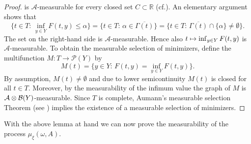 \documentclass[11pt]{article}
\newcommand{\cf}{cf.\xspace}
\numberwithin{equation}{section}
\def\mto{\mathchoice{\longmapsto}{\mapsto}{\mapsto}{\mapsto}}
\theoremstyle{definition}
\let\w\omega
\newcommand{\R}{\mathbb{R}}
\begin{document}
\begin{proof}
is $\mathcal{A}$-measurable for every closed set $C\subset \R$ (\cf \cite[Rem.\,6.4]{FoLe}). An elementary argument shows that\vspace*{-3pt}
\begin{equation*}
\{t\in T:\, \inf_{y\in Y}F(t,y)\leq\alpha\}=\{t\in T:\,\alpha\in \overline{\Gamma(t)}\}=\{t\in T:\, \overline{\Gamma(t)}\cap \{\alpha\}\neq\emptyset\}.
\end{equation*}
The set on the right-hand side is $\mathcal{A}$-measurable. Hence also $t\mto \inf_{y\in Y}F(t,y)$ is $\mathcal{A}$-measurable. To obtain the measurable selection of minimizers, define the multifunction $M:T\to\mathcal{P}(Y)$ by\vspace*{-3pt}
\begin{equation*}
M(t)=\{y\in Y:\,F(t,y)=\inf_{y\in Y}F(t,y)\}.
\end{equation*}
By assumption, $M(t)\neq\emptyset$ and due to lower semicontinuity $M(t)$ is closed for all $t\in T$. Moreover, by the measurability of the infimum value the graph of $M$ is $\mathcal{A}\otimes\nobreak\mathcal{B}(Y)$\nobreakdash-measurable. Since $T$ is complete, Aumann's measurable selection Theorem (see \cite[Th.\,6.10]{FoLe}) implies the existence of a measurable selection of minimizers.
\end{proof}
With the above lemma at hand we can now prove the measurability of the process $\mu_{\xi}(\w,A)$.
\end{document}
